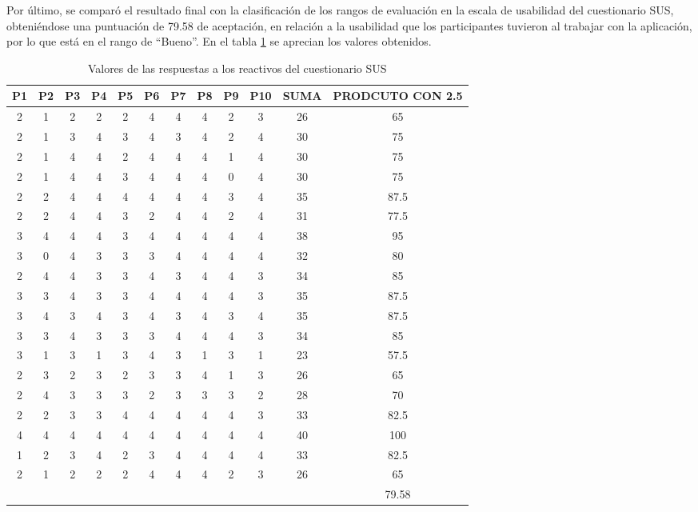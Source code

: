 \documentclass{article}
\begin{document}
Por último, se comparó el resultado final con la clasificación de los rangos de evaluación 
en la escala de usabilidad del cuestionario SUS, obteniéndose una puntuación de 79.58 de 
aceptación, en relación a la usabilidad que los participantes tuvieron al trabajar con la 
aplicación, por lo que está en el rango de “Bueno”. En el tabla \ref{tab:pruebas02} se aprecian los valores 
obtenidos.

\begin{table}[H]
\centering
\begin{tabular}{|c|c|c|c|c|c|c|c|c|c|c|c|}
\hline
P1 & P2 & P3 & P4 & P5 & P6 & P7 & P8 & P9 & P10 & SUMA & PRODCUTO CON 2.5\\ \hline
2 & 1 & 2 & 2 & 2 & 4 & 4 & 4 & 2 & 3 & 26 & 65\\ \hline
2 & 1 & 3 & 4 & 3 & 4 & 3 & 4 & 2 & 4 & 30 & 75\\ \hline
2 & 1 & 4 & 4 & 2 & 4 & 4 & 4 & 1 & 4 & 30 & 75\\ \hline
2 & 1 & 4 & 4 & 3 & 4 & 4 & 4 & 0 & 4 & 30 & 75\\ \hline
2 & 2 & 4 & 4 & 4 & 4 & 4 & 4 & 3 & 4 & 35 & 87.5\\ \hline
2 & 2 & 4 & 4 & 3 & 2 & 4 & 4 & 2 & 4 & 31 & 77.5\\ \hline
3 & 4 & 4 & 4 & 3 & 4 & 4 & 4 & 4 & 4 & 38 & 95\\ \hline
3 & 0 & 4 & 3 & 3 & 3 & 4 & 4 & 4 & 4 & 32 & 80\\ \hline
2 & 4 & 4 & 3 & 3 & 4 & 3 & 4 & 4 & 3 & 34 & 85\\ \hline
3 & 3 & 4 & 3 & 3 & 4 & 4 & 4 & 4 & 3 & 35 & 87.5\\ \hline
3 & 4 & 3 & 4 & 3 & 4 & 3 & 4 & 3 & 4 & 35 & 87.5\\ \hline
3 & 3 & 4 & 3 & 3 & 3 & 4 & 4 & 4 & 3 & 34 & 85\\ \hline
3 & 1 & 3 & 1 & 3 & 4 & 3 & 1 & 3 & 1 & 23 & 57.5\\ \hline
2 & 3 & 2 & 3 & 2 & 3 & 3 & 4 & 1 & 3 & 26 & 65\\ \hline
2 & 4 & 3 & 3 & 3 & 2 & 3 & 3 & 3 & 2 & 28 & 70\\ \hline
2 & 2 & 3 & 3 & 4 & 4 & 4 & 4 & 4 & 3 & 33 & 82.5\\ \hline
4 & 4 & 4 & 4 & 4 & 4 & 4 & 4 & 4 & 4 & 40 & 100\\ \hline
1 & 2 & 3 & 4 & 2 & 3 & 4 & 4 & 4 & 4 & 33 & 82.5\\ \hline
2 & 1 & 2 & 2 & 2 & 4 & 4 & 4 & 2 & 3 & 26 & 65\\ \hline
  &   &   &   &   &   &   &   &   &   &    & 79.58\\ \hline
\end{tabular}
\caption{Valores de las respuestas a los reactivos del cuestionario SUS}
\label{tab:pruebas02}
\end{table}
\end{document}
